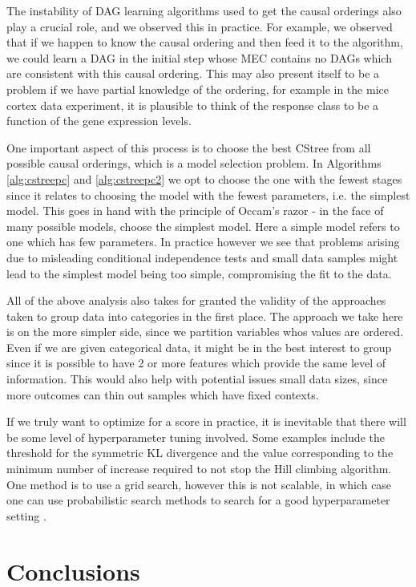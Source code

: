 \documentclass{tufte-book}
\begin{document}
The instability of DAG learning algorithms used to get the causal orderings also play a crucial role, and we observed this in practice. For example, we observed that if we happen to know the causal ordering and then feed it to the algorithm, we could learn a DAG in the initial step whose MEC contains no DAGs which are consistent with this causal ordering.  This may also present itself to be a problem if we have partial knowledge of the ordering, for example in the mice cortex data experiment, it is plausible to think of the response class to be a function of the gene expression levels.


One important aspect of this process is to choose the best CStree from all possible causal orderings, which is a model selection problem. In Algorithms \ref{alg:cstreepc} and \ref{alg:cstreepc2} we opt to choose the one with the fewest stages since it relates to choosing the model with the fewest parameters, i.e. the simplest model. This goes in hand with the principle of Occam's razor \cite{pearl-2009-causal} - in the face of many possible models, choose the simplest model. Here a simple model refers to one which has few parameters. In practice however we see that problems arising due to misleading conditional independence tests and small data samples might lead to the simplest model being too simple, compromising the fit to the data.


All of the above analysis also takes for granted the validity of the approaches taken to group data into categories in the first place. The approach we take here is on the more simpler side, since we partition variables whos values are ordered. Even if we are given categorical data, it might be in the best interest to group since it is possible to have 2 or more features which provide the same level of information. This would also help with potential issues small data sizes, since more outcomes can thin out samples which have fixed contexts.


If we truly want to optimize for a score in practice, it is inevitable that there will be some level of hyperparameter tuning involved. Some examples include the threshold for the symmetric KL divergence and the value corresponding to the minimum number of increase required to not stop the Hill climbing algorithm. One method is to use a grid search, however this is not scalable, in which case one can use probabilistic search methods to search for a good hyperparameter setting \cite{oh-2019-combin-bayes}.


\chapter{Conclusions}
\label{sec:org4aaf095}
\end{document}
